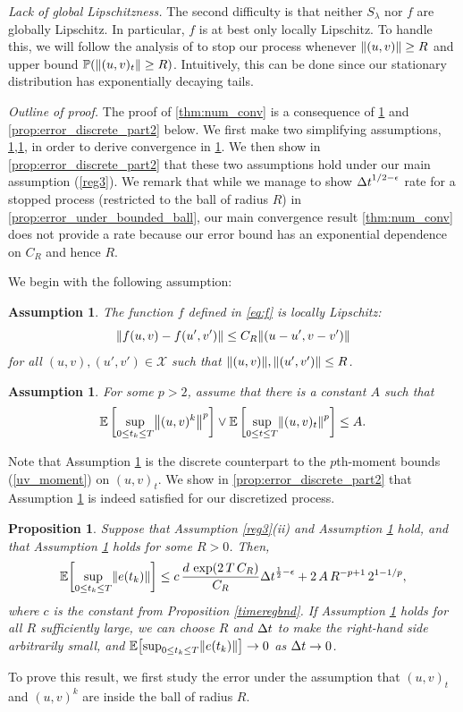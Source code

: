 \documentclass[11pt, twoside]{report}
\newtheorem{proposition}[theorem]{Proposition}
\newtheorem{assumption}[theorem]{Assumption}
\begin{document}
\textit{Lack of global Lipschitzness.}
The second difficulty is that  neither $S_\lambda$ nor $f$ are globally Lipschitz.  In particular, $f$ is at best only locally Lipschitz. To handle this, we will follow the analysis of \cite{higham2002strong} to stop our process whenever $\left\lVert(u,v)\right\rVert\geq R$ and upper bound $\mathbb{P}(\left\lVert(u,v)_t\right\rVert\geq R)$. Intuitively, this can be done since our stationary distribution has exponentially decaying tails. 

\textit{Outline of proof.}
The proof of \ref{thm:num_conv}  is a consequence of \ref{prop:error_discrete} and \ref{prop:error_discrete_part2} below. We first make two simplifying assumptions, \ref{ass:ball_R},\ref{ass:2}, in order to derive convergence in \ref{prop:error_discrete}. We then show in \ref{prop:error_discrete_part2} that these two assumptions hold under our main assumption (\ref{reg3}). 
 We remark that while we manage to show ${\Delta t}^{1/2-\epsilon}$ rate for a stopped process (restricted to the ball of radius $R$) in \ref{prop:error_under_bounded_ball}, our main convergence result \ref{thm:num_conv} does not provide a rate because our error bound has an exponential dependence on $C_R$ and hence $R$.

 We begin with the following assumption:
\begin{assumption}\label{ass:ball_R}
The function $f$ defined in \eqref{eq:f} is locally Lipschitz:
$$
\norm{f(u,v) - f(u',v')} \leq  C_R \norm{(u-u', v-v')}
$$
for all $(u,v),(u',v')\in \mathcal X$ such that $\norm{(u,v)}, \norm{(u',v')} \leq R$. 
\end{assumption}
%
\begin{assumption}\label{ass:2}   
For some $p>2$, assume that there is a constant $A$ such that
$$
\EE\left[\sup_{0\le t_k\leq T} \norm{(u,v)^k}^{p}\right] \vee \EE\left[\sup_{0\le t\leq T} \norm{(u,v)_t}^{p}\right] \leq A.
$$
\end{assumption}
Note that Assumption \ref{ass:2} is the discrete counterpart to the $p$th-moment bounds (\ref{uv_moment}) on $(u,v)_t$. We  show in \ref{prop:error_discrete_part2} that Assumption \ref{ass:2} is indeed satisfied for our discretized process.

\begin{proposition}\label{prop:error_discrete}
    Suppose that Assumption \ref{reg3}(ii) and Assumption \ref{ass:2} hold, and that Assumption \ref{ass:ball_R} holds for some $R>0$. Then, 
      $$
\EE\bp{ \sup_{0\leq t_k\leq T} \norm{e(t_k)} }\leq  c\,\frac{d \,\exp\pa{2\,T\, C_R}}{C_R}  \deltat^{\frac12-\epsilon} +  2\,A\, R^{-p+1}\, 2^{1-1/p},
$$
where $c$ is the constant from Proposition \ref{timeregbnd}.  If Assumption \ref{ass:ball_R} holds for all $R$ sufficiently large,  we can choose $R$ and ${\Delta t}$ to make the right-hand side arbitrarily small, and $\EE\bp{ \sup_{0\leq t_k\leq T} \norm{e(t_k)} }\to 0$ as ${\Delta t}\to 0$.
\end{proposition}
To prove this result, we first study the error under the assumption that $(u,v)_t$ and $(u,v)^k$ are inside the ball of radius $R$.
\end{document}
